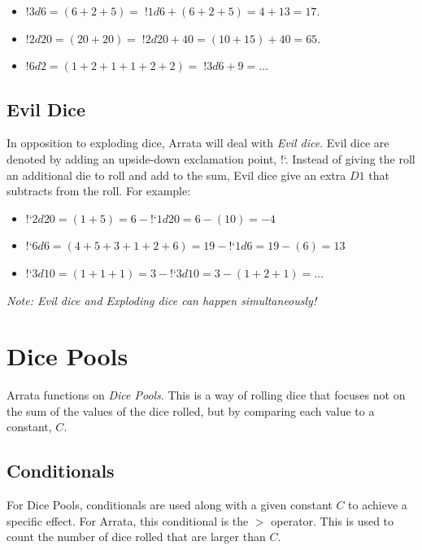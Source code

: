 \documentclass[../main.tex]{subfiles}
\begin{document}
    \begin{itemize}
        \item $!3d6 = (6 + 2 + 5) =\; !1d6 + (6 + 2 + 5) = 4 + 13 = 17$.
        \item $!2d20 = (20 + 20) =\; !2d20 + 40 = (10 + 15) + 40 = 65$.
        \item $!6d2 = (1 + 2 + 1 + 1 + 2 + 2) =\; !3d6 + 9 = \dots$
    \end{itemize}

    \subsection{Evil Dice}

    In opposition to exploding dice, Arrata will deal with {\em Evil dice}. Evil dice are denoted by adding an upside-down exclamation point, !`. Instead of giving the roll an additional die to roll and add to the sum, Evil dice give an extra $D1$ that subtracts from the roll. For example:

    \begin{itemize}
        \item!`$2d20 = (1 + 5) = 6 - $!`$1d20 = 6 - (10) = -4$
        \item!`$6d6 = (4 + 5 + 3 + 1 + 2 + 6) = 19 - $!`$1d6 = 19 - (6) = 13$
        \item!`$3d10 = (1 + 1 + 1) = 3 - $!`$3d10 = 3 - (1 + 2 + 1) = \dots$
    \end{itemize}

    {\em Note: Evil dice and Exploding dice can happen simultaneously!}

    \section{Dice Pools}

    Arrata functions on {\em Dice Pools}. This is a way of rolling dice that focuses not on the sum of the values of the dice rolled, but by comparing each value to a constant, $C$.

    \subsection{Conditionals}

    For Dice Pools, conditionals are used along with a given constant $C$ to achieve a specific effect. For Arrata, this conditional is the $>$ operator. This is used to count the number of dice rolled that are larger than $C$.
\end{document}
